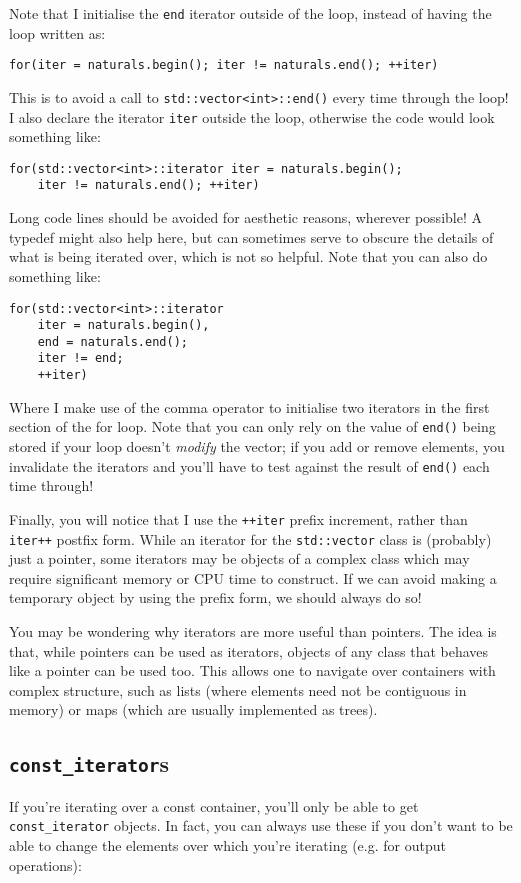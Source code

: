 \documentclass[a4paper]{scrartcl}
\begin{document}
Note that I initialise the \verb|end| iterator outside of the loop, instead of having the loop written as:
\begin{verbatim}
for(iter = naturals.begin(); iter != naturals.end(); ++iter)
\end{verbatim}

This is to avoid a call to \verb|std::vector<int>::end()| every time through the loop! I also declare the iterator \verb|iter| outside the loop, otherwise the code would look something like:
\begin{verbatim}
for(std::vector<int>::iterator iter = naturals.begin();
    iter != naturals.end(); ++iter)
\end{verbatim}

Long code lines should be avoided for aesthetic reasons, wherever possible! A typedef might also help here, but can sometimes serve to obscure the details of what is being iterated over, which is not so helpful. Note that you can also do something like:

\begin{verbatim}
for(std::vector<int>::iterator
    iter = naturals.begin(),
    end = naturals.end();
    iter != end;
    ++iter)
\end{verbatim}

Where I make use of the comma operator to initialise two iterators in the first section of the for loop. Note that you can only rely on the value of \verb|end()| being stored if your loop doesn't \emph{modify} the vector; if you add or remove elements, you invalidate the iterators and you'll have to test against the result of \verb|end()| each time through!


Finally, you will notice that I use the \verb|++iter| prefix increment, rather than \verb|iter++| postfix form. While an iterator for the \verb|std::vector| class is (probably) just a pointer, some iterators may be objects of a complex class which may require significant memory or CPU time to construct. If we can avoid making a temporary object by using the prefix form, we should always do so!

You may be wondering why iterators are more useful than pointers. The idea is that, while pointers can be used as iterators, objects of any class that behaves like a pointer can be used too. This allows one to navigate over containers with complex structure, such as lists (where elements need not be contiguous in memory) or maps (which are usually implemented as trees).

\subsection{\texttt{const\_iterator}s}
If you're iterating over a const container, you'll only be able to get \verb|const_iterator| objects. In fact, you can always use these if you don't want to be able to change the elements over which you're iterating (e.g. for output operations):
\end{document}
